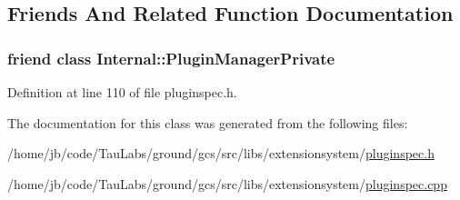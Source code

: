\subsection{\-Friends \-And \-Related \-Function \-Documentation}
\hypertarget{class_extension_system_1_1_plugin_spec_ac886620628a69def5b6d57fa12c39179}{
\subsubsection[{\-Internal\-::\-Plugin\-Manager\-Private}]{\setlength{\rightskip}{0pt plus 5cm}friend class {\bf \-Internal\-::\-Plugin\-Manager\-Private}}}\label{class_extension_system_1_1_plugin_spec_ac886620628a69def5b6d57fa12c39179}


\-Definition at line 110 of file pluginspec.\-h.



\-The documentation for this class was generated from the following files\-:\begin{DoxyCompactItemize}
\item 
/home/jb/code/\-Tau\-Labs/ground/gcs/src/libs/extensionsystem/\hyperlink{pluginspec_8h}{pluginspec.\-h}\item 
/home/jb/code/\-Tau\-Labs/ground/gcs/src/libs/extensionsystem/\hyperlink{pluginspec_8cpp}{pluginspec.\-cpp}\end{DoxyCompactItemize}
